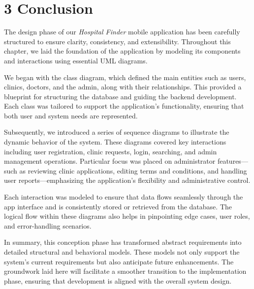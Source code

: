 \documentclass[12pt]{report}
\begin{document}
\section*{3 Conclusion}

\vspace{1em}

\noindent
The design phase of our \textit{Hospital Finder} mobile application has been carefully structured to ensure clarity, consistency, and extensibility. Throughout this chapter, we laid the foundation of the application by modeling its components and interactions using essential UML diagrams.
\vspace{1em}

\noindent
We began with the class diagram, which defined the main entities such as users, clinics, doctors, and the admin, along with their relationships. This provided a blueprint for structuring the database and guiding the backend development. Each class was tailored to support the application's functionality, ensuring that both user and system needs are represented.

\vspace{1em}

\noindent
Subsequently, we introduced a series of sequence diagrams to illustrate the dynamic behavior of the system. These diagrams covered key interactions including user registration, clinic requests, login, searching, and admin management operations. Particular focus was placed on administrator features—such as reviewing clinic applications, editing terms and conditions, and handling user reports—emphasizing the application's flexibility and administrative control.

\vspace{1em}

\noindent
Each interaction was modeled to ensure that data flows seamlessly through the app interface and is consistently stored or retrieved from the database. The logical flow within these diagrams also helps in pinpointing edge cases, user roles, and error-handling scenarios.

\vspace{1em}

\noindent
In summary, this conception phase has transformed abstract requirements into detailed structural and behavioral models. These models not only support the system’s current requirements but also anticipate future enhancements. The groundwork laid here will facilitate a smoother transition to the implementation phase, ensuring that development is aligned with the overall system design.
\end{document}
